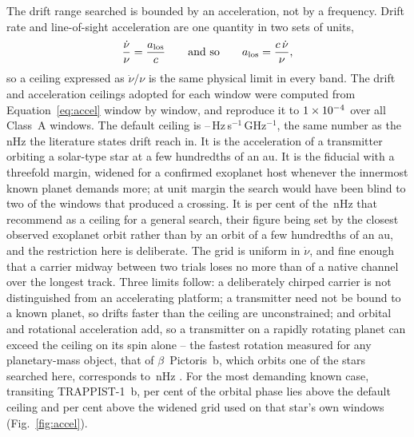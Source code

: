The drift range searched is bounded by an acceleration, not by a
frequency. Drift rate and line-of-sight acceleration are one quantity in
two sets of units,
%
\begin{equation}
\frac{\dot\nu}{\nu}=\frac{a_{\rm los}}{c}
\qquad\text{and so}\qquad
a_{\rm los}=\frac{c\,\dot\nu}{\nu},
\label{eq:accel}
\end{equation}
%
so a ceiling expressed as $\dot\nu/\nu$ is the same physical limit in
every band. The drift and acceleration ceilings adopted for each window
were computed from Equation~\ref{eq:accel} window by window, and
reproduce it to $1\times10^{-4}$ over all \DriftRelNWin{} Class~A windows.
The default ceiling is
\DriftCeilLo--\DriftCeilHi\,Hz\,s$^{-1}$\,GHz$^{-1}$, the same number as
the nHz the literature states drift reach in. It is the acceleration of a
transmitter orbiting a solar-type star at a few hundredths of an au. It is the \citet{Mason2025} fiducial with a
threefold margin, widened for a confirmed exoplanet host whenever the
innermost known planet demands more; at unit margin the search would have
been blind to two of the windows that produced a crossing. It is
\AccelSheikhPct{} per cent of the \AccelSheikhNHz\,nHz that
\citet{Sheikh2019} recommend as a ceiling for a general search, their figure
being set by the closest observed exoplanet orbit rather than by an orbit of
a few hundredths of an au, and the restriction here is deliberate. The grid is uniform
in $\dot\nu$, and fine enough
that a carrier midway between two trials loses no more than
\DriftGridFineHalf{} of a native channel over the longest track. Three
limits follow: a deliberately chirped carrier is not distinguished from an
accelerating platform; a transmitter need not be bound to a known planet,
so drifts faster than the ceiling are unconstrained; and orbital and
rotational acceleration add, so a transmitter on a rapidly rotating planet
can exceed the ceiling on its spin alone -- the fastest rotation measured for
any planetary-mass object, that of $\beta$~Pictoris~b, which orbits one of the
stars searched here, corresponds to \AccelBpicRotNHz\,nHz
\citep{Sheikh2019}. For the most demanding known case,
transiting TRAPPIST-1~b, \TrapPhaseHi{} per cent of the orbital phase lies
above the default ceiling and \TrapPhaseLo{} per cent above the widened
grid used on that star's own windows (Fig.~\ref{fig:accel}).


